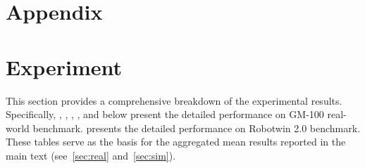 \appendix
\renewcommand\thesection{\Alph{section}}
\renewcommand\thefigure{S\arabic{figure}}
\renewcommand\thetable{S\arabic{table}}
\renewcommand\theequation{S\arabic{equation}}
\setcounter{figure}{0}
\setcounter{table}{0}
\setcounter{equation}{0}


\section*{Appendix}


\section{Experiment}\label{appendix:overview}
This section provides a comprehensive breakdown of the experimental results. 
%
Specifically, , , , ,  and  below present the detailed performance on GM-100 real-world benchmark.  presents the detailed performance on Robotwin 2.0 benchmark.
%
These tables serve as the basis for the aggregated mean results reported in the main text (see~\cref{sec:real} and~\cref{sec:sim}).

